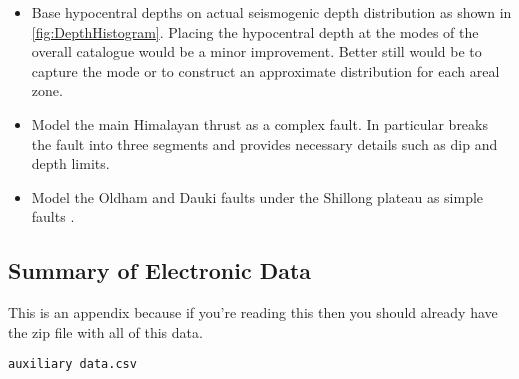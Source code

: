 \documentclass{article}
\begin{document}
\begin{appendices}
\begin{itemize}
\item Base hypocentral depths on actual seismogenic depth distribution as shown in \autoref{fig:DepthHistogram}. Placing the hypocentral depth at the modes of the overall catalogue would be a minor improvement. Better still would be to capture the mode or to construct an approximate distribution for each areal zone.
\item Model the main Himalayan thrust as a complex fault. In particular \cite{berryman2014himalayan} breaks the fault into three segments and provides necessary details such as dip and depth limits.
\item Model the Oldham and Dauki faults under the Shillong plateau as simple faults \citep{Bilham2001}.
\end{itemize}


\subsection{Summary of Electronic Data}
\label{appendix:Jobs}

This is an appendix because if you're reading this then you should already have the zip file with all of this data.

\texttt{auxiliary data.csv} 




\end{appendices}
\end{document}
